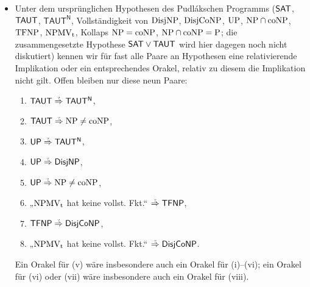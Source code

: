 \begin{itemize}[parsep=0pt,listparindent=\parindent,itemsep=5pt plus 1pt minus 1pt,midpenalty=0]
    \item Unter dem ursprünglichen Hypothesen des Pudlákschen Programms ($\mathsf{SAT}$, $ \mathsf{TAUT}$, $ \mathsf{TAUT^N}$, Vollständigkeit von $\mathrm{DisjNP}$, $ \mathrm{DisjCoNP}$, $ \mathrm{UP}$, $ \mathrm{NP}\cap\mathrm{coNP}$, $ \mathrm{TFNP}$, $ \mathrm{NPMV_t}$, Kollaps $\mathrm{NP}=\mathrm{coNP}$, $\mathrm{NP}\cap\mathrm{coNP}=\mathrm{P}$; die zusammengesetzte Hypothese $\mathsf{SAT}\lor\mathsf{TAUT}$ wird hier dagegen noch nicht diskutiert) kennen wir für fast alle Paare an Hypothesen eine relativierende Implikation oder ein entsprechendes Orakel, relativ zu diesem die Implikation nicht gilt. Offen bleiben nur diese neun Paare:
        \begin{enumerate}[noitemsep,midpenalty=0,label=(\roman*)]
            \item $\hTAUT\stackrel{\smash{\text{\raisebox{-1pt}{\tiny ?}}}}{\Rightarrow}\mathsf{TAUT^N}$,
            \item $\hTAUT\stackrel{\smash{\text{\raisebox{-1pt}{\tiny ?}}}}{\Rightarrow}\NP\neq\coNP$,
            \item $\hUP\stackrel{\smash{\text{\raisebox{-1pt}{\tiny ?}}}}{\Rightarrow}\mathsf{TAUT^N}$,
            \item $\hUP\stackrel{\smash{\text{\raisebox{-1pt}{\tiny ?}}}}{\Rightarrow}\hDisjNP$,
            \item $\hUP\stackrel{\smash{\text{\raisebox{-1pt}{\tiny ?}}}}{\Rightarrow}\NP\neq\coNP$,
            \item „$\mathrm{NPMV_t}$ hat keine vollst. Fkt.“ $\stackrel{\smash{\text{\raisebox{-1pt}{\tiny ?}}}}{\Rightarrow} \hTFNP$,
            \item $\hTFNP\stackrel{\smash{\text{\raisebox{-1pt}{\tiny ?}}}}{\Rightarrow} \hDisjCoNP$,
            \item „$\mathrm{NPMV_t}$ hat keine vollst. Fkt.“ $\stackrel{\smash{\text{\raisebox{-1pt}{\tiny ?}}}}{\Rightarrow} \hDisjCoNP$.

        \end{enumerate}
        Ein Orakel für (v) wäre insbesondere auch ein Orakel für (i)–(vi); ein Orakel für (vi) oder (vii) wäre insbesondere auch ein Orakel für (viii).
        

\end{itemize}
